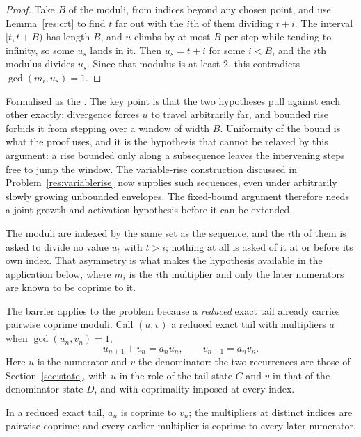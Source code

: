 \begin{proof}
Take $B$ of the moduli, from indices beyond any chosen point, and use
Lemma~\ref{res:crt} to find $t$ far out with the $i$th of them dividing $t+i$.
The interval $[t,t+B)$ has length $B$, and $u$ climbs by at most $B$ per step
while tending to infinity, so some $u_s$ lands in it.  Then $u_s=t+i$ for some
$i<B$, and the $i$th modulus divides $u_s$.  Since that modulus is at least
$2$, this contradicts $\gcd(m_i,u_s)=1$.
\end{proof}

\noindent Formalised as the
.  The key point is that the two hypotheses pull against each other
exactly: divergence forces $u$ to travel arbitrarily far, and bounded rise
forbids it from stepping over a window of width $B$.  Uniformity of the bound
is what the proof uses, and it is the hypothesis that cannot be relaxed by this
argument: a rise bounded only along a subsequence leaves the intervening steps
free to jump the window.  The variable-rise construction discussed in
Problem~\ref{res:variablerise} now supplies such sequences, even under
arbitrarily slowly growing unbounded envelopes.  The fixed-bound argument
therefore needs a joint growth-and-activation hypothesis before it can be
extended.

The moduli are indexed by the same set as the sequence, and the $i$th of them
is asked to divide no value $u_t$ with $t>i$; nothing at all is asked of it at
or before its own index.  That asymmetry is what makes the hypothesis available
in the application below, where $m_i$ is the $i$th multiplier and only the
later numerators are known to be coprime to it.

The barrier applies to the problem because a \emph{reduced} exact tail already
carries pairwise coprime moduli.  Call $(u,v)$ a reduced exact tail with
multipliers $a$ when $\gcd(u_n,v_n)=1$,
\[
 u_{n+1}+v_n=a_nu_n,\qquad v_{n+1}=a_nv_n .
\]
Here $u$ is the numerator and $v$ the denominator: the two recurrences are
those of Section~\ref{sec:state}, with $u$ in the role of the tail state $C$
and $v$ in that of the denominator state $D$, and with coprimality imposed at
every index.

\begin{proposition}\label{res:reduced}
In a reduced exact tail, $a_n$ is coprime to $v_n$; the multipliers at distinct
indices are pairwise coprime; and every earlier multiplier is coprime to every
later numerator.
\end{proposition}

